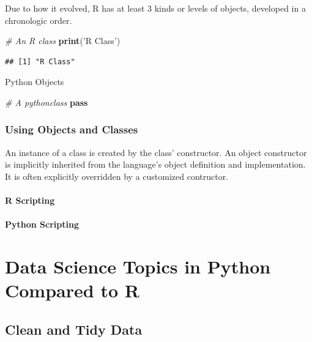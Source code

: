 \documentclass[]{book}
\newenvironment{Shaded}{\begin{snugshade}}{\end{snugshade}}
\newcommand{\KeywordTok}[1]{\textcolor[rgb]{0.13,0.29,0.53}{\textbf{#1}}}
\newcommand{\StringTok}[1]{\textcolor[rgb]{0.31,0.60,0.02}{#1}}
\newcommand{\CommentTok}[1]{\textcolor[rgb]{0.56,0.35,0.01}{\textit{#1}}}
\newcommand{\ControlFlowTok}[1]{\textcolor[rgb]{0.13,0.29,0.53}{\textbf{#1}}}
\newcommand{\NormalTok}[1]{#1}
\theoremstyle{definition}
\theoremstyle{definition}
\theoremstyle{definition}
\theoremstyle{remark}
\begin{document}
Due to how it evolved, R has at least 3 kinds or levels of objects,
developed in a chronologic order.

\begin{Shaded}
\begin{Highlighting}[]
\CommentTok{# An R class}
\KeywordTok{print}\NormalTok{(}\StringTok{'R Class'}\NormalTok{)}
\end{Highlighting}
\end{Shaded}

\begin{verbatim}
## [1] "R Class"
\end{verbatim}

Python Objects

\begin{Shaded}
\begin{Highlighting}[]
\CommentTok{# A pythonclass}
\ControlFlowTok{pass}
\end{Highlighting}
\end{Shaded}

\section{Using Objects and Classes}\label{using-objects-and-classes}

An instance of a class is created by the class' constructor. An object
constructor is implicitly inherited from the language's object
definition and implementation. It is often explicitly overridden by a
customized contructor.

\subsection{R Scripting}\label{r-scripting-4}

\subsection{Python Scripting}\label{python-scripting-4}

\part{Data Science Topics in Python Compared to
R}\label{part-data-science-topics-in-python-compared-to-r}

\chapter{Clean and Tidy Data}\label{clean-and-tidy-data}
\end{document}
